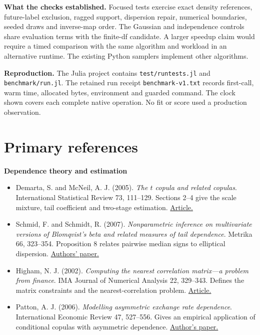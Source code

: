 \documentclass[11pt,letterpaper]{article}
\newcommand{\sect}[1]{\section*{\color{ink}#1}}
\newcommand{\lead}[1]{\textbf{\textcolor{accent}{#1}}}
\newcommand{\src}[2]{\href{#1}{#2}}
\begin{document}
\lead{What the checks established.} Focused tests exercise exact density references, future-label exclusion, ragged support, dispersion repair, numerical boundaries, seeded draws and inverse-map order. The Gaussian and independence controls share evaluation terms with the finite-df candidate. A larger speedup claim would require a timed comparison with the same algorithm and workload in an alternative runtime. The existing Python samplers implement other algorithms.

\lead{Reproduction.} The Julia project contains \texttt{test/runtests.jl} and \texttt{benchmark/run.jl}. The retained run receipt \texttt{benchmark-v1.txt} records first-call, warm time, allocated bytes, environment and guarded command. The clock shown covers each complete native operation. No fit or score used a production observation.

\newpage
\sect{Primary references}
\lead{Dependence theory and estimation}
\begin{itemize}\setlength{\itemsep}{3pt}
\item Demarta, S. and McNeil, A. J. (2005). \emph{The \(t\) copula and related copulas}. International Statistical Review 73, 111--129. Sections 2--4 give the scale mixture, tail coefficient and two-stage estimation. \src{https://doi.org/10.1111/j.1751-5823.2005.tb00254.x}{Article.}
\item Schmid, F. and Schmidt, R. (2007). \emph{Nonparametric inference on multivariate versions of Blomqvist's beta and related measures of tail dependence}. Metrika 66, 323--354. Proposition 8 relates pairwise median signs to elliptical dispersion. \src{https://wisostat.uni-koeln.de/fileadmin/sites/statistik/pdf_publikationen/SchmidSchmidtBlomqvistsBeta.pdf}{Authors' paper.}
\item Higham, N. J. (2002). \emph{Computing the nearest correlation matrix---a problem from finance}. IMA Journal of Numerical Analysis 22, 329--343. Defines the matrix constraints and the nearest-correlation problem. \src{https://doi.org/10.1093/imanum/22.3.329}{Article.}
\item Patton, A. J. (2006). \emph{Modelling asymmetric exchange rate dependence}. International Economic Review 47, 527--556. Gives an empirical application of conditional copulas with asymmetric dependence. \src{https://public.econ.duke.edu/~ap172/Patton_IER_2006.pdf}{Author's paper.}
\end{itemize}
\end{document}
